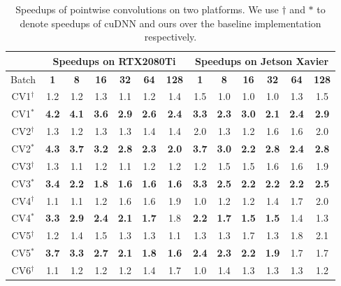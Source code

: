 \begin{table}[]
\setlength{\tabcolsep}{3.8pt}
\caption{Speedups of pointwise convolutions on two platforms. We use ${\dag}$ and ${*}$ to denote speedups of cuDNN and ours over the baseline implementation respectively.}
\label{tab:pwspeedup}
\begin{threeparttable}
\begin{tabular}{c|cccccc|cccccc}
\toprule
&\multicolumn{6}{c|}{Speedups on RTX2080Ti} & \multicolumn{6}{c}{Speedups on Jetson Xavier}\\


\midrule
Batch& \textbf{1} & \textbf{8} & \textbf{16}& \textbf{32} & \textbf{64} & \textbf{128} & \textbf{1} & \textbf{8} & \textbf{16}& \textbf{32} & \textbf{64} & \textbf{128}\\
\hline
CV1$^{\dag}$&1.2 &1.2 &1.3 &1.1 &1.2 &1.4 &1.5 &1.0 &1.0 &1.0 &1.3 &1.5 \\
CV1$^{*}$&\textbf{4.2} &\textbf{4.1} &\textbf{3.6} &\textbf{2.9} &\textbf{2.6} &\textbf{2.4} &\textbf{3.3} &\textbf{2.3} &\textbf{3.0} &\textbf{2.1} &\textbf{2.4} &\textbf{2.9} \\
\hline
CV2$^{\dag}$&1.3 &1.2 &1.3 &1.3 &1.4 &1.4 &2.0 &1.3 &1.2 &1.6 &1.6 &2.0 \\
CV2$^{*}$&\textbf{4.3} &\textbf{3.7} &\textbf{3.2} &\textbf{2.8} &\textbf{2.3} &\textbf{2.0} &\textbf{3.7} &\textbf{3.0} &\textbf{2.2} &\textbf{2.8} &\textbf{2.4} &\textbf{2.8} \\
\hline
CV3$^{\dag}$&1.3 &1.1 &1.2 &1.1 &1.2 &1.2 &1.2 &1.5 &1.5 &1.6 &1.6 &1.9 \\
CV3$^{*}$&\textbf{3.4} &\textbf{2.2} &\textbf{1.8} &\textbf{1.6} &\textbf{1.6} &\textbf{1.6} &\textbf{3.3} &\textbf{2.5} &\textbf{2.2} &\textbf{2.2} &\textbf{2.2} &\textbf{2.5} \\
\hline
CV4$^{\dag}$&1.1 &1.1 &1.2 &1.6 &1.6 &1.9 &1.0 &1.2 &1.2 &1.4 &1.7 &2.0 \\
CV4$^{*}$&\textbf{3.3} &\textbf{2.9} &\textbf{2.4} &\textbf{2.1} &\textbf{1.7} &1.8 &\textbf{2.2} &\textbf{1.7} &\textbf{1.5} &\textbf{1.5} &1.4 &1.3 \\
\hline
CV5$^{\dag}$&1.2 &1.4 &1.5 &1.3 &1.3 &1.1 &1.3 &1.3 &1.7 &1.3 &1.8 &2.1 \\
CV5$^{*}$&\textbf{3.7} &\textbf{3.3} &\textbf{2.7} &\textbf{2.1} &\textbf{1.8} &\textbf{1.6} &\textbf{2.4} &\textbf{2.3} &\textbf{2.2} &\textbf{1.9} &1.7 &1.7 \\
\hline
CV6$^{\dag}$&1.1 &1.2 &1.2 &1.2 &1.4 &1.7 &1.0 &1.4 &1.3 &1.3 &1.3 &1.2 \\

\end{tabular}
\end{threeparttable}
\end{table}
